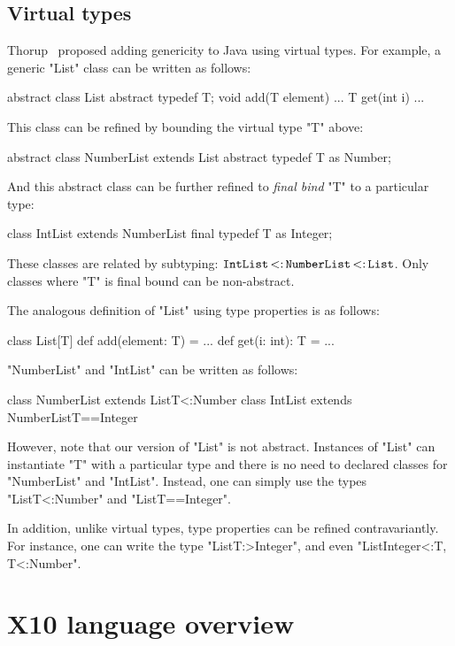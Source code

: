 \documentclass[preprint,nocopyrightspace,9pt]{sigplanconf}
\begin{document}
\subsection{Virtual types}
\label{sec:virtual}

Thorup~\cite{thorup97}
proposed adding genericity to Java using virtual types.  For example,
a generic \xcd"List" class can be written as follows:
\begin{xten}
abstract class List {
    abstract typedef T;
    void add(T element) { ... }
    T get(int i) { ... }
}
\end{xten}
This class can be refined by bounding the virtual type \xcd"T" above:
\begin{xten}
abstract class NumberList extends List {
    abstract typedef T as Number;
}
\end{xten}
And this abstract class can be further refined to \emph{final bind}
\xcd"T" to a particular type:
\begin{xten}
class IntList extends NumberList {
    final typedef T as Integer;
}
\end{xten}
These classes are related by subtyping:
${\tt IntList} \subtype {\tt NumberList} \subtype {\tt List}$.
Only classes where \xcd"T" is final bound can be non-abstract.

The analogous definition of 
\xcd"List" using type properties is as follows:
\begin{xten}
class List[T] {
    def add(element: T) = { ... }
    def get(i: int): T = { ... }
}
\end{xten}

\noindent
\xcd"NumberList" and \xcd"IntList" can be written as follows:
\begin{xten}
class NumberList extends List{T<:Number} { }
class IntList extends NumberList{T==Integer} { }
\end{xten}

However, note that our version of \xcd"List" is not abstract.
Instances of \xcd"List"
can instantiate \xcd"T" with a particular type and there is no
need to declared classes for \xcd"NumberList" and \xcd"IntList".
Instead, one can simply use the types
\xcd"List{T<:Number}" and \xcd"List{T==Integer}".

In addition,
unlike virtual types, type properties can be refined contravariantly.
For instance, one can write the type \xcd"List{T:>Integer}",
and even \xcd"List{Integer<:T, T<:Number}".

\section{X10 language overview}
\label{sec:lang}
\end{document}
